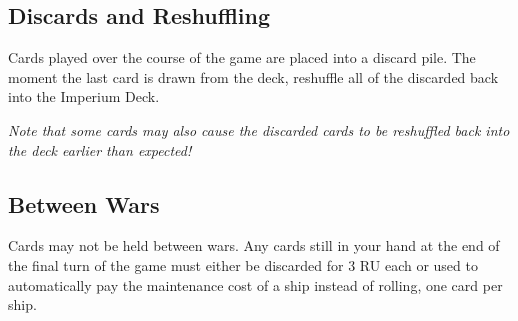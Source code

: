 \subsection{Discards and Reshuffling}

Cards played over the course of the game are placed into a discard pile. The moment the last card is drawn from the deck, reshuffle all of the discarded back into the Imperium Deck.

\textit{Note that some cards may also cause the discarded cards to be reshuffled back into the deck earlier than expected!}

\subsection{Between Wars}

Cards may not be held between wars. Any cards still in your hand at the end of the final turn of the game must either be discarded for 3 RU each or used to automatically pay the maintenance cost of a ship instead of rolling, one card per ship.